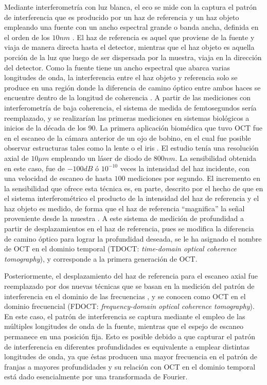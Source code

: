 Mediante interferometría con luz blanca, el eco se mide con la captura el patrón de interferencia que es producido por un haz de referencia y un haz objeto empleando una fuente con un ancho espectral grande o banda ancha, definida en el orden de los $10nm$ \cite{Tomlins, Fercher}. El haz de referencia es aquel que proviene de la fuente y viaja de manera directa hasta el detector, mientras que el haz objeto es aquella porción de la luz que luego de ser dispersada por la muestra, viaja en la dirección del detector. Como la fuente tiene un ancho espectral que abarca varias longitudes de onda, la interferencia entre el haz objeto y referencia solo se produce en una región donde la diferencia de camino óptico entre ambos haces se encuentre dentro de la longitud de coherencia \cite{Drexler2015}. A partir de las mediciones con interferometría de baja coherencia, el sistema de medida de femtosegundos sería reemplazado, y se realizarían las primeras mediciones en sistemas biológicos a inicios de la década de los 90. La primera aplicación biomédica que tuvo OCT fue en el escaneo de la cámara anterior de un ojo \exvivo de bobino, en el cual fue posible  observar estructuras tales como la lente o el iris \cite{Huang1991_2}. El estudio tenía una resolución axial de $10\mu m$ empleando un láser de diodo de $800nm$. La sensibilidad obtenida en este caso, fue de $-100dB$ ó $10^{-10}$ veces la intensidad del haz incidente, con una velocidad de escaneo de hasta $100$ mediciones por segundo. El incremento en la sensibilidad que ofrece esta técnica es, en parte, descrito por el hecho de que en el sistema interferométrico el producto de la intensidad del haz de referencia y el haz objeto es medido, de forma que el haz de referencia ``magnifica'' la señal proveniente desde la muestra \cite{Drexler2015, Fercher1996, Schmitt1999_2}. A este sistema de medición de profundidad a partir de desplazamientos en el haz de referencia, pues se modifica la diferencia de camino óptico para lograr la profundidad deseada, se le ha asignado el nombre de OCT en el dominio temporal (TDOCT: \textit{time-domain optical coherence tomography}), y corresponde a la primera generación de OCT.

Posteriormente, el desplazamiento del haz de referencia para el escaneo axial fue reemplazado por dos nuevas técnicas que se basan en la medición del patrón de interferencia en el dominio de las frecuencias \cite{Drexler2015, Wojtkowski2002, Leitgeb2003}, y se conocen como OCT en el dominio frecuencial (FDOCT: \textit{frequency-domain optical coherence tomography}). En este caso, el patrón de interferencia se captura mediante el empleo de las múltiples longitudes de onda de la fuente, mientras que el espejo de escaneo permanece en una posición fija. Esto es posible debido a que capturar el patrón de interferencia en diferentes profundidades es equivalente a emplear distintas longitudes de onda, ya que éstas producen una mayor frecuencia en el patrón de franjas a mayores profundidades y su relación con OCT en el dominio temporal está dado esencialmente por una transformada de Fourier. 

